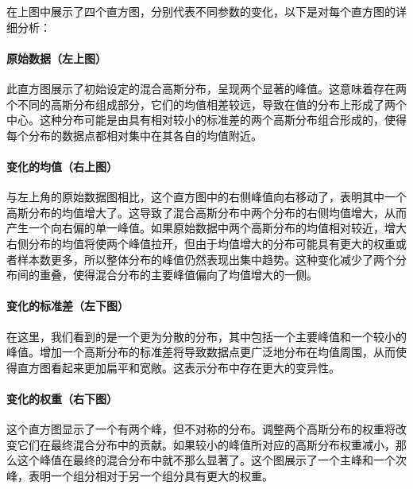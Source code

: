 \documentclass[a4paper]{article}
\begin{document}
在上图中展示了四个直方图，分别代表不同参数的变化，以下是对每个直方图的详细分析：

\paragraph{原始数据（左上图）}
此直方图展示了初始设定的混合高斯分布，呈现两个显著的峰值。这意味着存在两个不同的高斯分布组成部分，它们的均值相差较远，导致在值的分布上形成了两个中心。这种分布可能是由具有相对较小的标准差的两个高斯分布组合形成的，使得每个分布的数据点都相对集中在其各自的均值附近。


\paragraph{变化的均值（右上图）}
与左上角的原始数据图相比，这个直方图中的右侧峰值向右移动了，表明其中一个高斯分布的均值增大了。这导致了混合高斯分布中两个分布的右侧均值增大，从而产生一个向右偏的单一峰值。如果原始数据中两个高斯分布的均值相对较近，增大右侧分布的均值将使两个峰值拉开，但由于均值增大的分布可能具有更大的权重或者样本数更多，所以整体分布的峰值仍然表现出集中趋势。这种变化减少了两个分布间的重叠，使得混合分布的主要峰值偏向了均值增大的一侧。

\paragraph{变化的标准差（左下图）}
在这里，我们看到的是一个更为分散的分布，其中包括一个主要峰值和一个较小的峰值。增加一个高斯分布的标准差将导致数据点更广泛地分布在均值周围，从而使得直方图看起来更加扁平和宽敞。这表示分布中存在更大的变异性。

\paragraph{变化的权重（右下图）}
这个直方图显示了一个有两个峰，但不对称的分布。调整两个高斯分布的权重将改变它们在最终混合分布中的贡献。如果较小的峰值所对应的高斯分布权重减小，那么这个峰值在最终的混合分布中就不那么显著了。这个图展示了一个主峰和一个次峰，表明一个组分相对于另一个组分具有更大的权重。
\end{document}
